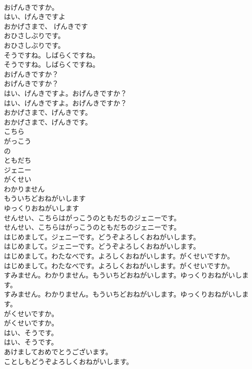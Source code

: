 \documentclass[8pt]{extreport}
\begin{document}
\begin{CJK}{UTF8}{min}
\\	おげんきですか。
\\	はい、げんきですよ
\\	おかげさまで、 げんきです
\\	おひさしぶりです。	
\\	おひさしぶりです。 
\\	そうですね。しばらくですね。	
\\	そうですね。しばらくですね。 
\\	おげんきですか？	
\\	おげんきですか？ 
\\	はい、げんきですよ。おげんきですか？	
\\	はい、げんきですよ。おげんきですか？ 
\\	おかげさまで、げんきです。	
\\	おかげさまで、げんきです。 
\\	こちら
\\	がっこう
\\	の
\\	ともだち
\\	ジェニー
\\	がくせい
\\	わかりません
\\	もういちどおねがいします
\\	ゆっくりおねがいします
\\	せんせい、こちらはがっこうのともだちのジェニーです。	
\\	せんせい、こちらはがっこうのともだちのジェニーです。 
\\	はじめまして。ジェニーです。どうぞよろしくおねがいします。	
\\	はじめまして。ジェニーです。どうぞよろしくおねがいします。 
\\	はじめまして。わたなべです。よろしくおねがいします。がくせいですか。	
\\	はじめまして。わたなべです。よろしくおねがいします。がくせいですか。 
\\	すみません。わかりません。もういちどおねがいします。ゆっくりおねがいします。	
\\	すみません。わかりません。もういちどおねがいします。ゆっくりおねがいします。 
\\	がくせいですか。	
\\	がくせいですか。 
\\	はい、そうです。	
\\	はい、そうです。 
\\	あけましておめでとうございます。
\\	ことしもどうぞよろしくおねがいします。

\end{CJK}
\end{document}
